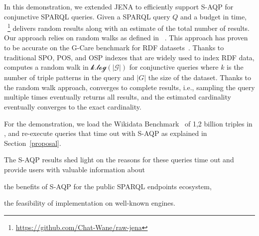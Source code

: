   In this demonstration, we extended JENA to efficiently support
  S-AQP for conjunctive 
  SPARQL queries. Given a SPARQL query $Q$ and a budget in time,
  \NAME~\footnote{\url{https://github.com/Chat-Wane/raw-jena}} delivers random results along with an estimate of the
  total number of results. Our approach relies on random
 walks as defined in \WANDER~\cite{li2019wanderjoin}. 
 This approach has proven to be accurate on the G-Care
 benchmark for RDF datasets~\cite{DBLP:conf/sigmod/ParkKBKHH20}. Thanks
 to traditional SPO, POS, and OSP indexes that are widely used to index RDF data,
 \NAME computes a random walk in $\mathcal{k.log(|G|)}$ for conjunctive queries where
 $k$ is the number of triple patterns in the query and $|G|$ the size
 of the dataset. Thanks to the random walk approach, \NAME converges
 to complete results, i.e., sampling the query multiple times eventually
 returns all results, and the estimated cardinality eventually converges
 to the exact cardinality.

 \noindent For the demonstration, we load the Wikidata
 Benchmark~\cite{angles2022wdbench} of 1,2 billion triples in \NAME, and
 re-execute queries that time out with S-AQP as explained in
 Section~\ref{proposal}. 
 
 The S-AQP results shed light on the reasons for these queries time out and provide users with valuable  information about
\begin{inparaenum}[(i)]
\item the benefits of S-AQP for the public SPARQL endpoints ecosystem,
\item the feasibility of implementation on well-known engines.
\end{inparaenum}


